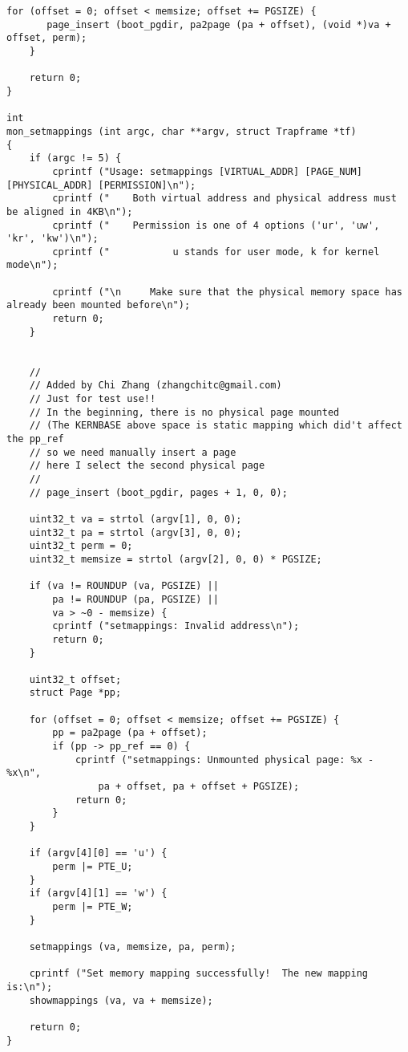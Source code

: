 \documentclass{article}
\begin{document}
\begin{CJK*}{UTF8}{gkai}
\begin{enumerate}
{\begin{lstlisting}[style=ccode, title={\scriptsize \ttfamily \bfseries kern/monitor.c}]
    for (offset = 0; offset < memsize; offset += PGSIZE) {
       page_insert (boot_pgdir, pa2page (pa + offset), (void *)va + offset, perm); 
    }

    return 0;
}

int
mon_setmappings (int argc, char **argv, struct Trapframe *tf)
{
    if (argc != 5) {
        cprintf ("Usage: setmappings [VIRTUAL_ADDR] [PAGE_NUM] [PHYSICAL_ADDR] [PERMISSION]\n");
        cprintf ("    Both virtual address and physical address must be aligned in 4KB\n");
        cprintf ("    Permission is one of 4 options ('ur', 'uw', 'kr', 'kw')\n");
        cprintf ("           u stands for user mode, k for kernel mode\n");

        cprintf ("\n     Make sure that the physical memory space has already been mounted before\n");
        return 0;
    }


    //
    // Added by Chi Zhang (zhangchitc@gmail.com)
    // Just for test use!!
    // In the beginning, there is no physical page mounted
    // (The KERNBASE above space is static mapping which did't affect the pp_ref
    // so we need manually insert a page
    // here I select the second physical page
    // 
    // page_insert (boot_pgdir, pages + 1, 0, 0);

    uint32_t va = strtol (argv[1], 0, 0);
    uint32_t pa = strtol (argv[3], 0, 0);
    uint32_t perm = 0;
    uint32_t memsize = strtol (argv[2], 0, 0) * PGSIZE;

    if (va != ROUNDUP (va, PGSIZE) ||
        pa != ROUNDUP (pa, PGSIZE) ||
        va > ~0 - memsize) {
        cprintf ("setmappings: Invalid address\n");
        return 0;
    }

    uint32_t offset;
    struct Page *pp;

    for (offset = 0; offset < memsize; offset += PGSIZE) {
        pp = pa2page (pa + offset);
        if (pp -> pp_ref == 0) {
            cprintf ("setmappings: Unmounted physical page: %x - %x\n", 
                pa + offset, pa + offset + PGSIZE);
            return 0;
        }
    }

    if (argv[4][0] == 'u') {
        perm |= PTE_U;
    }
    if (argv[4][1] == 'w') {
        perm |= PTE_W;
    }

    setmappings (va, memsize, pa, perm);

    cprintf ("Set memory mapping successfully!  The new mapping is:\n");
    showmappings (va, va + memsize);

    return 0;
}
\end{lstlisting}

}
\end{enumerate}
\end{CJK*}
\end{document}
